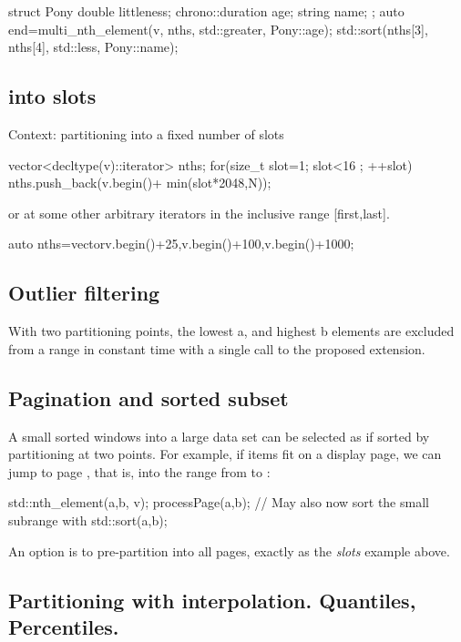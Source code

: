 \begin{codeblock}
struct Pony{
  double littleness; 
  chrono::duration age;
  string name;
};
auto end=multi_nth_element(v, nths, std::greater{}, Pony::age);
std::sort(nths[3], nths[4], std::less{}, Pony::name);
\end{codeblock}

\subsection{ into slots}
Context: partitioning into a fixed number of slots
\begin{codeblock}
vector<decltype(v)::iterator> nths;
for(size_t slot=1; slot<16 ; ++slot){
	nths.push_back(v.begin()+ min(slot*2048,N));
}
\end{codeblock}
or at some other arbitrary iterators in the inclusive range [first,last].
\begin{codeblock}
auto nths=vector{v.begin()+25,v.begin()+100,v.begin()+1000}; 
\end{codeblock}

\subsection{Outlier filtering}

With two partitioning points, the lowest a, and highest b elements are excluded from a range in constant time with a single call to the proposed extension.

\subsection{Pagination and sorted subset}

A small sorted windows into a large data set can be selected as if sorted by partitioning at two points. For example, if  items fit on a display page, we can jump to page , that is, into the range from  to :

\begin{codeblock}
std::nth_element({a,b}, v);
processPage(a,b); // May also now sort the small subrange with std::sort(a,b);
\end{codeblock}

An option is to pre-partition into all pages, exactly as the \emph{slots} example above.

\subsection{Partitioning with interpolation. Quantiles, Percentiles.}


